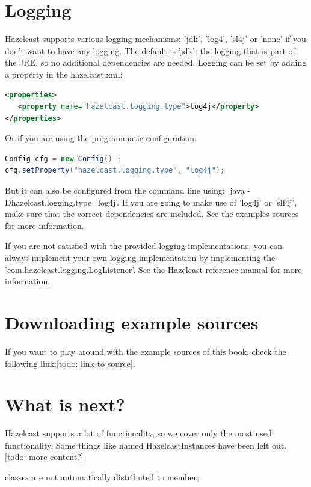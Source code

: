 \section{Logging}
Hazelcast supports various logging mechanisms; 'jdk', 'log4', 'sl4j' or 'none' if you don't want to have any logging. The default is 'jdk': the logging that is part of the JRE, so no additional dependencies are needed. Logging can be set by adding a property in the hazelcast.xml:
\begin{lstlisting}[language=xml]
<properties>
   <property name="hazelcast.logging.type">log4j</property>
</properties>
\end{lstlisting}
Or if you are using the programmatic configuration:
\begin{lstlisting}[language=java]
Config cfg = new Config() ;
cfg.setProperty("hazelcast.logging.type", "log4j");
\end{lstlisting}
But it can also be configured from the command line using: 'java -Dhazelcast.logging.type=log4j'. If you are going to make use of 'log4j' or 'slf4j', make sure that the correct dependencies are included. See the examples sources for more information.

If you are not satisfied with the provided logging implementations, you can always implement your own logging implementation by implementing the 'com.hazelcast.logging.LogListener'. See the Hazelcast reference manual for more information.

\section{Downloading example sources}
If you want to play around with the example sources of this book, check the following link:[todo: link to source]. 

\section{What is next?}
Hazelcast supports a lot of functionality, so we cover only the most used functionality. Some things like named HazelcastInstances have been left out. [todo: more content?]

classes are not automatically distributed to member; 
